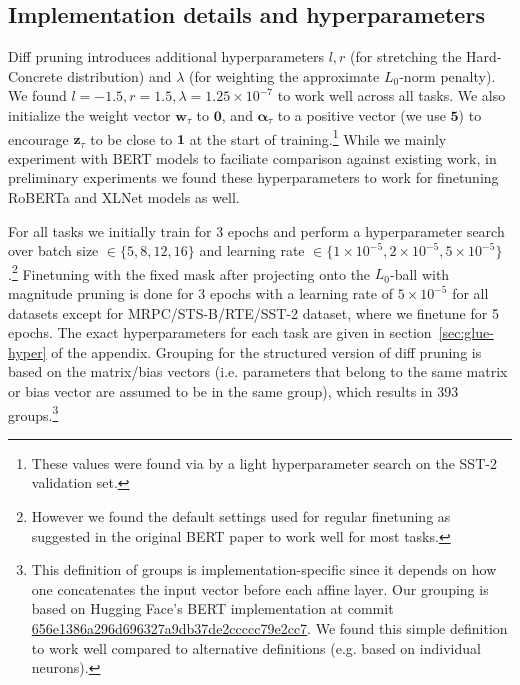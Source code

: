 \subsection{Implementation details and hyperparameters}
\label{sec:implementation}

Diff pruning introduces additional hyperparameters $l,r$ (for stretching the Hard-Concrete distribution) and $\lambda$ (for weighting the approximate $L_0$-norm penalty). We found $l =-1.5, r=1.5, \lambda = 1.25 \times 10^{-7}$ to work well across all tasks. We also initialize the weight vector $\mathbf{w}_\tau$ to $\mathbf{0}$, and $\boldsymbol{\alpha}_\tau$ to  a positive vector (we use $\mathbf{5}$) to encourage $\mathbf{z}_\tau$ to be close to $\mathbf{1}$ at the start of training.\footnote{These values were found via by a light hyperparameter search on the SST-2 validation set.} While we mainly experiment with BERT models to faciliate comparison against existing work, in preliminary experiments we found these hyperparameters to work for finetuning RoBERTa \citep{liu2019roberta} and XLNet \citep{yang2019xlnet} models as well.

For all tasks we initially train for 3 epochs and perform a  hyperparameter search over batch size $\in \{5,8,12,16\}$ and learning rate  $\in \{1 \times 10^{-5}, 2 \times 10^{-5},5 \times 10^{-5}\}$.\footnote{However we found the default settings used for  regular finetuning as suggested in the original BERT paper to work well for most tasks.} Finetuning with the fixed mask after projecting onto the $L_0$-ball with magnitude pruning is done for 3 epochs with a learning rate of $5 \times 10^{-5}$ for all datasets except for  MRPC/STS-B/RTE/SST-2 dataset, where we finetune for 5 epochs. The exact hyperparameters for each task are given in section~\ref{sec:glue-hyper} of the appendix. Grouping for the structured version of diff pruning is based on the matrix/bias vectors (i.e. parameters that belong to the same matrix or bias vector are assumed to be in the same group), which  results in 393 groups.\footnote{This definition of groups is implementation-specific since it depends on how one concatenates the input vector before each affine layer. Our grouping is based on Hugging Face's BERT  implementation at commit \textsf{\fontsize{8}{10}\selectfont \href{https://github.com/huggingface/transformers/blob/656e1386a296d696327a9db37de2ccccc79e2cc7/src/transformers/modeling_bert.py}{656e1386a296d696327a9db37de2ccccc79e2cc7}}. We found this simple definition to work well compared to alternative definitions (e.g. based on individual neurons).}

